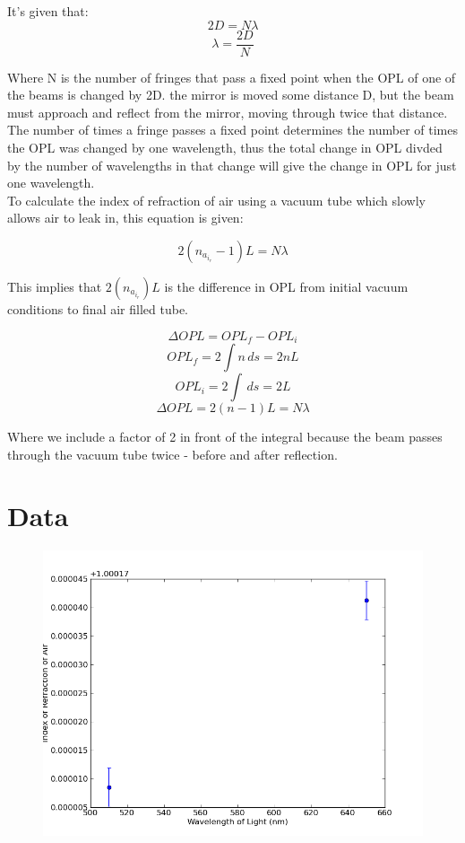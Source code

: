 \documentclass[12pt]{article}
\begin{document}
\indent It's given that:
\[ 2D = N\lambda \]
\[ \lambda = \frac{2D}{N} \]

\indent Where N is the number of fringes that pass a fixed point when the OPL of one of the beams is changed by 2D. the mirror is moved some distance D, but the beam must approach and reflect from the mirror, moving through twice that distance. The number of times a fringe passes a fixed point determines the number of times the OPL was changed by one wavelength, thus the total change in OPL divded by the number of wavelengths in that change will give the change in OPL for just one wavelength. \\

\indent To calculate the index of refraction of air using a vacuum tube which slowly allows air to leak in, this equation is given:

\[ 2(n_a_i_r - 1)L = N\lambda \]

\indent This implies that $2(n_a_i_r)L$ is the difference in OPL from initial vacuum conditions to final air filled tube.

\[ \Delta OPL = OPL_f - OPL_i \]
\[ OPL_f = 2\int n \,ds = 2nL\]
\[ OPL_i = 2\int \,ds = 2L\]
\[\Delta OPL = 2(n-1)L = N\lambda \]

\indent Where we include a factor of 2 in front of the integral because the beam passes through the vacuum tube twice - before and after reflection.

\section{Data}
\begin{figure}[H]
\centering
\hspace{-0.0in}\includegraphics[scale=0.60]{Plot1.png}
\end{figure}
\end{document}

